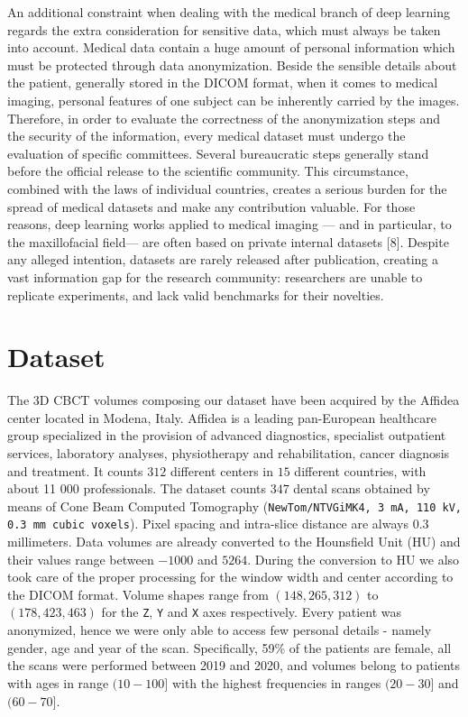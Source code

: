 An additional constraint when dealing with the medical branch of deep learning
regards the extra consideration for sensitive data, which must always be taken
into account. Medical data contain a huge amount of personal information which
must be protected through data anonymization. Beside the sensible details about
the patient, generally stored in the DICOM format, when it comes to medical
imaging, personal features of one subject can be inherently carried by the
images. Therefore, in order to evaluate the correctness of the anonymization
steps and the security of the information, every medical dataset must undergo
the evaluation of specific committees. Several bureaucratic steps generally
stand before the official release to the scientific community. This
circumstance, combined with the laws of individual countries, creates a serious
burden for the spread of medical datasets and make any contribution valuable.
For those reasons, deep learning works applied to medical imaging — and in
particular, to the maxillofacial field— are often based on private internal
datasets [8]. Despite any alleged intention, datasets are rarely released after
publication, creating a vast information gap for the research community:
researchers are unable to replicate experiments, and lack valid benchmarks for
their novelties.

\section{Dataset}
The 3D CBCT volumes composing our dataset have been acquired by the Affidea
center located in Modena, Italy. Affidea is a leading pan-European healthcare
group specialized in the provision of advanced diagnostics, specialist
outpatient services, laboratory analyses, physiotherapy and rehabilitation,
cancer diagnosis and treatment. It counts $312$ different centers in $15$ different
countries, with about 11 000 professionals. The dataset counts $347$ dental scans
obtained by means of Cone Beam Computed Tomography (\texttt{NewTom/NTVGiMK4, 3 mA, 110
kV, 0.3 mm cubic voxels}). Pixel spacing and intra-slice distance are always $0.3$
millimeters. Data volumes are already converted to the Hounsfield Unit (HU) and
their values range between $-1000$ and $5264$. During the conversion to HU we also
took care of the proper processing for the window width and center according to
the DICOM format.
Volume shapes range from $(148, 265, 312)$ to $(178, 423, 463)$ for the
\texttt{Z}, \texttt{Y} and \texttt{X} axes respectively.
Every patient was anonymized, hence we were only able to access few personal
details - namely gender, age and year of the scan. Specifically, 59\% of the
patients are female, all the scans were performed between 2019 and 2020, and
volumes belong to patients with ages in range $(10-100]$ with the highest
frequencies in ranges $(20-30]$ and $(60-70]$.

